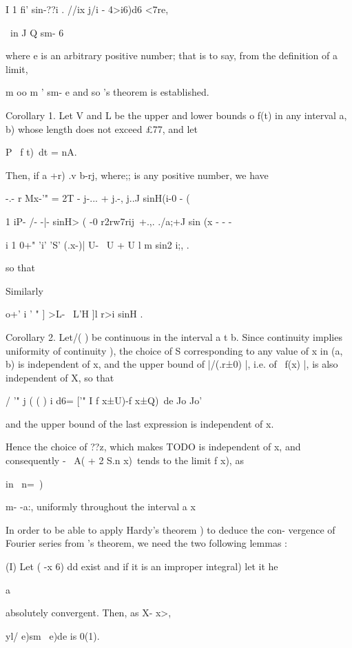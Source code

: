 I 1 fi' sin-??i . //ix j/i - 4>i6)d6 <7re,

\ in J Q sm- 6

where e is an arbitrary positive number; that is to say, from the
definition of a limit,

m oo m ' sm- e and so \Fejer's theorem is established.
%
%

Corollary 1. Let V and L be the upper and lower bounds o f(t) in any
interval a, b) whose length does not exceed £77, and let

P \ f t)\ dt = nA.

Then, if a +r) .v b-rj, where;; is any positive number, we have

 -.- r Mx-'" = 2T - j-... + j.-, j..J sinH(i-0 - (

  1 iP- /- -|- sinH> ( -0 r2rw7rij\ +.,. ./a;+J sin (x - - -

i 1 0+" 'i' 'S' (.x-)| U- \ U + U l m sin2 i;, .

so that

Similarly

    o+' i ' " ] >L- \ L'H ]l r>i sinH .

Corollary 2. Let/( ) be continuous in the interval a t b. Since
continuity implies uniformity of continuity ), the choice of S
corresponding to any value of x in (a, b) is independent of x, and the
upper bound of |/(.r±0) |, i.e. of \ f(x) |, is also independent of X,
so that

/ '" j ( ( ) i d6= ['" I f x±U)-f x±Q)\ de Jo Jo'

and the upper bound of the last expression is independent of x.

Hence the choice of ??z, which makes
TODO
is independent of x, and consequently - \ A( + 2 S.n x)\ tends to the
limit f x), as

in \ n=\ )

m- -a:, uniformly throughout the interval a x%


In order to be able to apply Hardy's theorem ) to deduce the
con- vergence of Fourier series from \Fejer's theorem, we need the two
following lemmas :

(I) Let ( -x 6) dd exist and if it is an improper integral) let it he

  a

absolutely convergent. Then, as X- x>,

yl/ e)sm \ e)de is 0(1).

